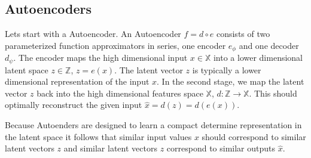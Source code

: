 \subsection{Autoencoders}


Lets start with a Autoencoder. An Autoencoder $f = d \circ e$ consists of two parameterized function approximators in series, one encoder $e_\phi$ and one decoder $d_\psi$. 
The encoder maps the high dimensional input $x \in \mathbb{X}$ into a lower dimensional latent space $z \in \mathbb{Z}$, $z = e(x)$.
The latent vector $z$ is typically a lower dimensional representation of the input $x$. 
In the second stage, we map the latent vector $z$ back into the high dimensional features space $\mathbb{X}$, $d: \mathbb{Z} \to \mathbb{X}$. This should optimally reconstruct the given input $\hat{x} = d(z) = d(e(x))$. 

Because Autoenders are designed to learn a compact determine representation in the latent space it follows that similar input values $x$ should correspond to similar latent vectors $z$ and similar latent vectors $z$ correspond to similar outputs $\hat{x}$.

